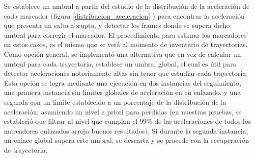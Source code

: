 \begin{itemize}
Se establece un umbral a partir del estudio de la distribución de la aceleración de cada marcador (figura \ref{distribucion_aceleracion} ) para encontrar la aceleración que presenta un salto abrupto, y detectar los frames donde se supera dicho umbral para corregir el marcador. El procedimiento para estimar los marcadores en estos casos, es el mismo que se verá al momento de inventario de trayectorias. 
\\ 

Como opción general, se implementó una alternativa que en vez de calcular un umbral para cada trayectoria, establece un umbral global, el cual es útil para detectar aceleraciones notoriamente altas sin tener que estudiar cada trayectoria. Esta opción se logra mediante una ejecución en dos instancias del seguimiento, una primera instancia sin limites globales de aceleración en en enlazado, y una segunda con un limite establecido a un porcentaje de la distribución de la aceleración, asumiendo un nivel a priori para perdidas (en nuestras pruebas, se estableció que filtrar al nivel que cumplan el 99\% de las aceleraciones de todos los marcadores enlazados arroja buenos resultados). Si durante la segunda instancia, un enlace global supera este umbral, se descarta y se procede con la recuperación de trayectoria.


\end{itemize}
